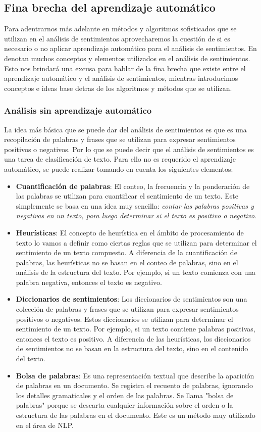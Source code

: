 \documentclass[12pt, conference]{IEEEtran}
\begin{document}
\subsection{Fina brecha del aprendizaje automático}
Para adentrarnos más adelante en métodos y algoritmos sofisticados que se utilizan en el análisis de sentimientos aprovecharemos la cuestión de si es necesario o no aplicar aprendizaje automático para el análisis de sentimientos. 
En \cite{b5} denotan muchos conceptos y elementos utilizados en el análisis de sentimientos. Esto nos brindará una excusa para hablar de la fina brecha que existe entre el aprendizaje automático y el análisis de sentimientos, mientras introducimos conceptos e ideas base detras de los algoritmos y métodos que se utilizan.

\subsubsection{Análisis sin aprendizaje automático}
La idea más básica que se puede dar del análisis de sentimientos es que es una recopilación de palabras y frases que se utilizan para expresar sentimientos positivos o negativos. Por lo que se puede decir que el análisis de sentimientos es una tarea de clasificación de texto. Para ello no es requerido el aprendizaje automático, se puede realizar tomando en cuenta los siguientes elementos:
\begin{itemize}
\item \textbf{Cuantificación de palabras}: El conteo, la frecuencia y la ponderación de las palabras se utilizan para cuantificar el sentimiento de un texto. Este simplemente se basa en una idea muy sencilla: \textit{contar las palabras positivas y negativas en un texto, para luego determinar si el texto es positivo o negativo}.
\item \textbf{Heurísticas}: El concepto de heurística en el ámbito de procesamiento de texto lo vamos a definir como ciertas reglas que se utilizan para determinar el sentimiento de un texto compuesto. 
A diferencia de la cuantificación de palabras, las heurísticas no se basan en el conteo de palabras, sino en el análisis de la estructura del texto. 
Por ejemplo, si un texto comienza con una palabra negativa, entonces el texto es negativo.
\item \textbf{Diccionarios de sentimientos}: Los diccionarios de sentimientos son una colección de palabras y frases que se utilizan para expresar sentimientos positivos o negativos. 
Estos diccionarios se utilizan para determinar el sentimiento de un texto. 
Por ejemplo, si un texto contiene palabras positivas, entonces el texto es positivo. 
A diferencia de las heurísticas, los diccionarios de sentimientos no se basan en la estructura del texto, sino en el contenido del texto.
\item \textbf{Bolsa de palabras}: Es una representación textual que describe la aparición de palabras en un documento. Se registra el recuento de palabras, ignorando los detalles gramaticales y el orden de las palabras. Se llama "bolsa de palabras" porque se descarta cualquier información sobre el orden o la estructura de las palabras en el documento. Este es un método muy utilizado en el área de NLP.
\end{itemize}
\end{document}
